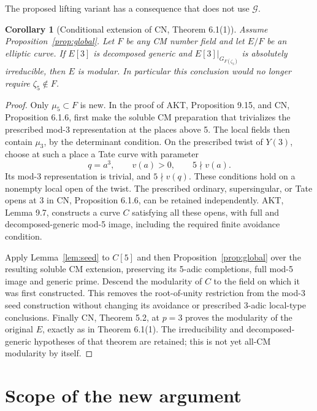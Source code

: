 \documentclass[11pt,a4paper]{article}
\newtheorem{corollary}[theorem]{Corollary}
\theoremstyle{definition}\newtheorem{definition}[theorem]{Definition}
\theoremstyle{remark}\newtheorem*{remark}{Remark}
\newcommand{\Ginput}{\mathcal G}
\begin{document}
The proposed lifting variant has a consequence that does not use
$\Ginput$.

\begin{corollary}[Conditional extension of CN, Theorem 6.1(1)]\label{cor:mod3}
Assume Proposition~\ref{prop:global}. Let $F$ be any CM number field and
let $E/F$ be an elliptic curve. If $E[3]$ is decomposed generic and
$E[3]|_{G_{F(\zeta_3)}}$ is absolutely irreducible, then $E$ is modular.
In particular this conclusion would no longer require $\zeta_5\notin F$.
\end{corollary}
\begin{proof}
Only $\mu_5\subset F$ is new. In the proof of AKT, Proposition 9.15,
and CN, Proposition 6.1.6, first make the soluble CM preparation that
trivializes the prescribed mod-3 representation at the places above 5.
The local fields then contain $\mu_3$, by the determinant condition.
On the prescribed twist of $Y(3)$, choose at such a place a Tate curve
with parameter
\[
 q=a^3,\qquad v(a)>0,\qquad 5\nmid v(a).
\]
Its mod-3 representation is trivial, and $5\nmid v(q)$. These conditions
hold on a nonempty local open of the twist. The prescribed ordinary,
supersingular, or Tate opens at 3 in CN, Proposition 6.1.6, can be
retained independently. AKT, Lemma 9.7, constructs a curve $C$ satisfying
all these opens, with full and decomposed-generic mod-5 image, including
the required finite avoidance condition.

Apply Lemma~\ref{lem:seed} to $C[5]$ and then
Proposition~\ref{prop:global} over the resulting soluble CM extension,
preserving its 5-adic completions, full mod-5 image and generic prime.
Descend the modularity of $C$ to the field on which it was first
constructed. This removes the root-of-unity restriction from the mod-3
seed construction without changing its avoidance or prescribed 3-adic
local-type conclusions. Finally CN, Theorem 5.2, at $p=3$ proves the
modularity of the original $E$, exactly as in Theorem 6.1(1).
The irreducibility and decomposed-generic hypotheses of that theorem
are retained; this is not yet all-CM modularity by itself.
\end{proof}


\section{Scope of the new argument}
\end{document}
